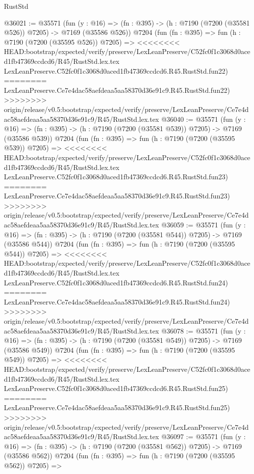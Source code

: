 \begin{lexlean}{RustStd}
\begin{coremodule}
{\begin{coremodule}
{{{{{{{{{{{{{{{{{{{{{{{{{{{{{{{{@36021 := @35571
    (fun (y : @16) => (fn : @395) -> (h : @7190 (@7200 (@35581 @526)) @7205) -> @7169 (@35586 @526))
    @7204
    (fun (fn : @395) =>
    fun (h : @7190 (@7200 (@35595 @526)) @7205) =>
<<<<<<<< HEAD:bootstrap/expected/verify/preserve/LexLeanPreserve/C52fc0f1c3068d0aced1fb47369ccdcd6/R45/RustStd.lex.tex
    LexLeanPreserve.C52fc0f1c3068d0aced1fb47369ccdcd6.R45.RustStd.fun22)
========
    LexLeanPreserve.Ce7e4dac58aefdeaa5aa58370d36e91c9.R45.RustStd.fun22)
>>>>>>>> origin/release/v0.5:bootstrap/expected/verify/preserve/LexLeanPreserve/Ce7e4dac58aefdeaa5aa58370d36e91c9/R45/RustStd.lex.tex
@36040 := @35571
    (fun (y : @16) => (fn : @395) -> (h : @7190 (@7200 (@35581 @539)) @7205) -> @7169 (@35586 @539))
    @7204
    (fun (fn : @395) =>
    fun (h : @7190 (@7200 (@35595 @539)) @7205) =>
<<<<<<<< HEAD:bootstrap/expected/verify/preserve/LexLeanPreserve/C52fc0f1c3068d0aced1fb47369ccdcd6/R45/RustStd.lex.tex
    LexLeanPreserve.C52fc0f1c3068d0aced1fb47369ccdcd6.R45.RustStd.fun23)
========
    LexLeanPreserve.Ce7e4dac58aefdeaa5aa58370d36e91c9.R45.RustStd.fun23)
>>>>>>>> origin/release/v0.5:bootstrap/expected/verify/preserve/LexLeanPreserve/Ce7e4dac58aefdeaa5aa58370d36e91c9/R45/RustStd.lex.tex
@36059 := @35571
    (fun (y : @16) => (fn : @395) -> (h : @7190 (@7200 (@35581 @544)) @7205) -> @7169 (@35586 @544))
    @7204
    (fun (fn : @395) =>
    fun (h : @7190 (@7200 (@35595 @544)) @7205) =>
<<<<<<<< HEAD:bootstrap/expected/verify/preserve/LexLeanPreserve/C52fc0f1c3068d0aced1fb47369ccdcd6/R45/RustStd.lex.tex
    LexLeanPreserve.C52fc0f1c3068d0aced1fb47369ccdcd6.R45.RustStd.fun24)
========
    LexLeanPreserve.Ce7e4dac58aefdeaa5aa58370d36e91c9.R45.RustStd.fun24)
>>>>>>>> origin/release/v0.5:bootstrap/expected/verify/preserve/LexLeanPreserve/Ce7e4dac58aefdeaa5aa58370d36e91c9/R45/RustStd.lex.tex
@36078 := @35571
    (fun (y : @16) => (fn : @395) -> (h : @7190 (@7200 (@35581 @549)) @7205) -> @7169 (@35586 @549))
    @7204
    (fun (fn : @395) =>
    fun (h : @7190 (@7200 (@35595 @549)) @7205) =>
<<<<<<<< HEAD:bootstrap/expected/verify/preserve/LexLeanPreserve/C52fc0f1c3068d0aced1fb47369ccdcd6/R45/RustStd.lex.tex
    LexLeanPreserve.C52fc0f1c3068d0aced1fb47369ccdcd6.R45.RustStd.fun25)
========
    LexLeanPreserve.Ce7e4dac58aefdeaa5aa58370d36e91c9.R45.RustStd.fun25)
>>>>>>>> origin/release/v0.5:bootstrap/expected/verify/preserve/LexLeanPreserve/Ce7e4dac58aefdeaa5aa58370d36e91c9/R45/RustStd.lex.tex
@36097 := @35571
    (fun (y : @16) => (fn : @395) -> (h : @7190 (@7200 (@35581 @562)) @7205) -> @7169 (@35586 @562))
    @7204
    (fun (fn : @395) =>
    fun (h : @7190 (@7200 (@35595 @562)) @7205) =>
}}}}}}}}}}}}}}}}}}}}}}}}}}}}}}}}
\end{coremodule}}
\end{coremodule}
\end{lexlean}
